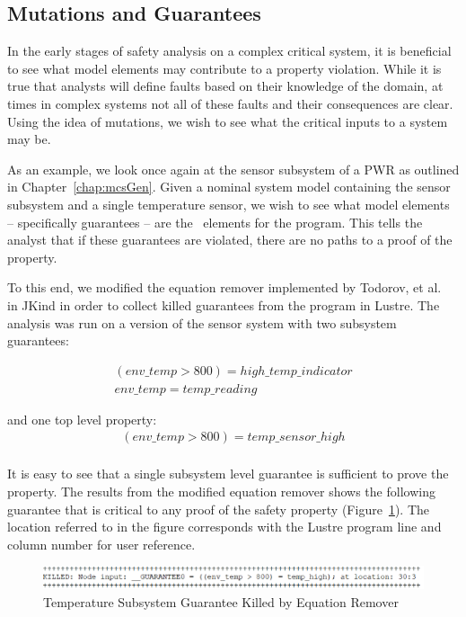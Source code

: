 \subsection{Mutations and Guarantees}
\label{sec:granularityMutationInputs}
In the early stages of safety analysis on a complex critical system, it is beneficial to see what model elements may contribute to a property violation. While it is true that analysts will define faults based on their knowledge of the domain, at times in complex systems not all of these faults and their consequences are clear. Using the idea of mutations, we wish to see what the critical inputs to a system may be. 

As an example, we look once again at the sensor subsystem of a PWR as outlined in Chapter~\ref{chap:mcsGen}. Given a nominal system model containing the sensor subsystem and a single temperature sensor, we wish to see what model elements -- specifically guarantees -- are the \mustcov\  elements for the program. This tells the analyst that if these guarantees are violated, there are no paths to a proof of the property. 

To this end, we modified the equation remover implemented by Todorov, et al.~\cite{NFM2020Todorov} in JKind in order to collect killed guarantees from the program in Lustre. The analysis was run on a version of the sensor system with two subsystem guarantees: 

\begin{gather*}
\mathit{(env\_temp > 800) = high\_temp\_indicator}\\
\mathit{env\_temp = temp\_reading}
\end{gather*}

and one top level property:
\begin{gather*}
\mathit{(env\_temp > 800) = temp\_sensor\_high}\\
\end{gather*}

It is easy to see that a single subsystem level guarantee is sufficient to prove the property. The results from the modified equation remover shows the following guarantee that is critical to any proof of the safety property (Figure~\ref{fig:guaranteesKilledSensor}). The location referred to in the figure corresponds with the Lustre program line and column number for user reference.

\begin{figure}[h]
	\begin{center}
		\includegraphics[scale=0.8]{images/guaranteesKilledSensor.PNG}
	\end{center}
	\caption{Temperature Subsystem Guarantee Killed by Equation Remover}
	\label{fig:guaranteesKilledSensor}
\end{figure}

